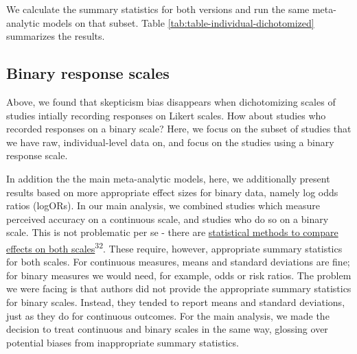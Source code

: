 \documentclass[
  doc,floatsintext]{apa6}
\begin{document}
We calculate the summary statistics for both versions and run the same meta-analytic models on that subset. Table \ref{tab:table-individual-dichotomized} summarizes the results.

\begin{table}

\caption{\label{tab:table-individual-dichotomized}Model results}
\centering
{}
\end{table}

\subsection{Binary response scales}\label{binary-response-scales}

Above, we found that skepticism bias disappears when dichotomizing scales of studies intially recording responses on Likert scales. How about studies who recorded responses on a binary scale? Here, we focus on the subset of studies that we have raw, individual-level data on, and focus on the studies using a binary response scale.

In addition the the main meta-analytic models, here, we additionally present results based on more appropriate effect sizes for binary data, namely log odds ratios (logORs). In our main analysis, we combined studies which measure perceived accuracy on a continuous scale, and studies who do so on a binary scale. This is not problematic per se - there are \href{https://training.cochrane.org/handbook/current/chapter-10\#section-10-6}{statistical methods to compare effects on both scales}\textsuperscript{32}. These require, however, appropriate summary statistics for both scales. For continuous measures, means and standard deviations are fine; for binary measures we would need, for example, odds or risk ratios. The problem we were facing is that authors did not provide the appropriate summary statistics for binary scales. Instead, they tended to report means and standard deviations, just as they do for continuous outcomes. For the main analysis, we made the decision to treat continuous and binary scales in the same way, glossing over potential biases from inappropriate summary statistics.
\end{document}
